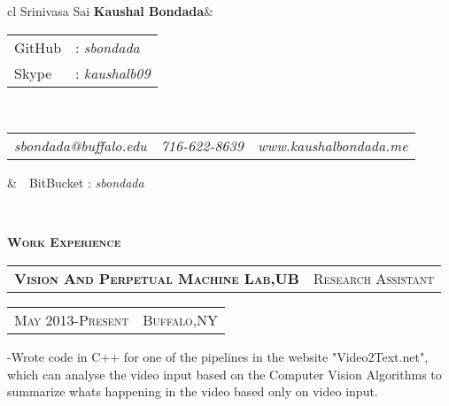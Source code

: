 \documentclass[10pt,a4paper,oneside]{article}
\begin{document}
    \begin{center}
        \begin{tabular}{cl}
            {\Huge \textmd{Srinivasa Sai} \textbf{Kaushal Bondada}}&\begin{tabular}{ll}
                                                                        \textcolor{light-gray}{GitHub}&: \textit{sbondada}\\[0.1cm]
                                                                        \textcolor{light-gray}{Skype}&: \textit{kaushalb09}
                                                                    \end{tabular}\\[0.35cm]
            \begin{tabular}{c|c|c}
                \textit{sbondada@buffalo.edu}&\textit{716-622-8639}&\textit{www.kaushalbondada.me} 
            \end{tabular}                                          &\ \ \textcolor{light-gray}{BitBucket} : \textit{sbondada}
        \end{tabular}\\[0.6cm]
        \textcolor{light-gray}{\hrulefill} 
    \end{center} 
    \vspace{0pt}
    \vspace{0pt}
    \textcolor{light-gray}{\textbf{\large W\textsc{ork} E\textsc{xperience}}}
    \vspace{4pt}\\
    \begin{tabular}{c|c}
        \textbf{\normalsize V\textsc{ision} A\textsc{nd} P\textsc{erpetual} M\textsc{achine} L\textsc{ab},UB}
        &\textmd{\normalsize R\textsc{esearch} A\textsc{ssistant}}
    \end{tabular}
    \hspace{1.73in}
    \textcolor{light-gray}{
        \begin{tabular}{c|c}
            {\small M\textsc{ay 2013}-P\textsc{resent}}
           &{\small B\textsc{uffalo},NY}
        \end{tabular}
    } 
    \vspace{-4mm}
    \begin{adjustwidth}{7pt}{0pt}
        {\footnotesize -Wrote code in C++ for one of the pipelines in the website "Video2Text.net", which can analyse 
        the video input based on the Computer Vision Algorithms to
        summarize whats happening in the video based only on video input.}\\
    \end{adjustwidth}
\end{document}
